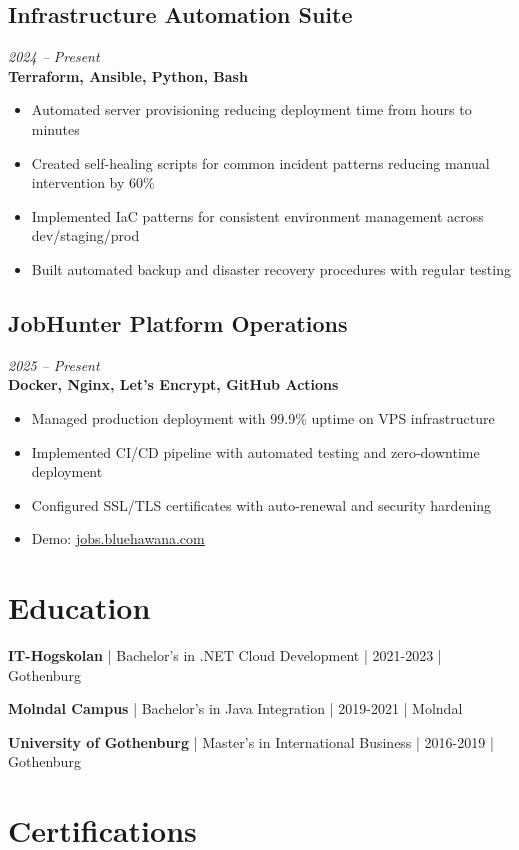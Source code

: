 \documentclass[11pt,a4paper]{article}
\begin{document}
\subsection*{Infrastructure Automation Suite}
\textit{2024 -- Present} \\
\textbf{Terraform, Ansible, Python, Bash}
\begin{itemize}[leftmargin=*, itemsep=2pt]
\item Automated server provisioning reducing deployment time from hours to minutes
\item Created self-healing scripts for common incident patterns reducing manual intervention by 60\%
\item Implemented IaC patterns for consistent environment management across dev/staging/prod
\item Built automated backup and disaster recovery procedures with regular testing
\end{itemize}

\subsection*{JobHunter Platform Operations}
\textit{2025 -- Present} \\
\textbf{Docker, Nginx, Let's Encrypt, GitHub Actions}
\begin{itemize}[leftmargin=*, itemsep=2pt]
\item Managed production deployment with 99.9\% uptime on VPS infrastructure
\item Implemented CI/CD pipeline with automated testing and zero-downtime deployment
\item Configured SSL/TLS certificates with auto-renewal and security hardening
\item Demo: \href{https://jobs.bluehawana.com}{jobs.bluehawana.com}
\end{itemize}

\section*{Education}

\textbf{IT-Hogskolan} | Bachelor's in .NET Cloud Development | 2021-2023 | Gothenburg

\textbf{Molndal Campus} | Bachelor's in Java Integration | 2019-2021 | Molndal

\textbf{University of Gothenburg} | Master's in International Business | 2016-2019 | Gothenburg

\section*{Certifications}
\end{document}
